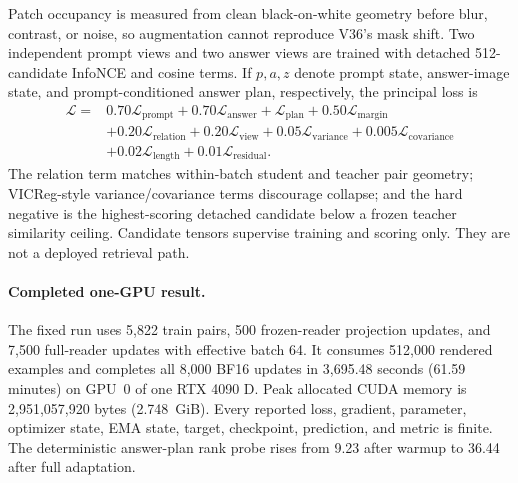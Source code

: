 \documentclass[11pt]{article}
\begin{document}
Patch occupancy is measured from clean black-on-white geometry before blur,
contrast, or noise, so augmentation cannot reproduce V36's mask shift. Two
independent prompt views and two answer views are trained with detached
512-candidate InfoNCE and cosine terms. If \(p,a,z\) denote prompt state,
answer-image state, and prompt-conditioned answer plan, respectively, the
principal loss is
\begin{align*}
\mathcal L={}&0.70\mathcal L_{\mathrm{prompt}}
+0.70\mathcal L_{\mathrm{answer}}
+\mathcal L_{\mathrm{plan}}
+0.50\mathcal L_{\mathrm{margin}}\\
&+0.20\mathcal L_{\mathrm{relation}}
+0.20\mathcal L_{\mathrm{view}}
+0.05\mathcal L_{\mathrm{variance}}
+0.005\mathcal L_{\mathrm{covariance}}\\
&+0.02\mathcal L_{\mathrm{length}}
+0.01\mathcal L_{\mathrm{residual}}.
\end{align*}
The relation term matches within-batch student and teacher pair geometry;
VICReg-style variance/covariance terms discourage collapse; and the hard
negative is the highest-scoring detached candidate below a frozen teacher
similarity ceiling. Candidate tensors supervise training and scoring only.
They are not a deployed retrieval path.

\paragraph{Completed one-GPU result.}
The fixed run uses 5,822 train pairs, 500 frozen-reader projection updates, and
7,500 full-reader updates with effective batch 64. It consumes 512,000 rendered
examples and completes all 8,000 BF16 updates in 3,695.48 seconds
(61.59 minutes) on GPU~0 of one RTX 4090 D. Peak allocated CUDA memory is
2,951,057,920 bytes (2.748~GiB). Every reported loss, gradient, parameter,
optimizer state, EMA state, target, checkpoint, prediction, and metric is
finite. The deterministic answer-plan rank probe rises from 9.23 after warmup
to 36.44 after full adaptation.
\end{document}
